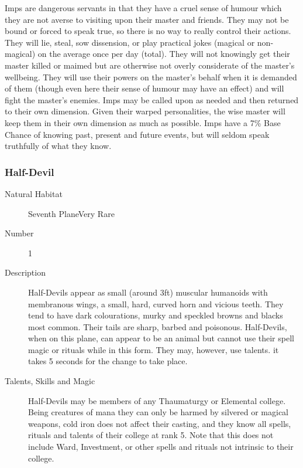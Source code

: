 \begin{multicols*}{2}
\begin{description}
\setlength\itemsep{0pt}

\item[Comments]Imps are dangerous servants in that they have a cruel sense
of humour which they are not averse to visiting upon their master and
friends.  They may not be bound or forced to speak true, so there is
no way to really control their actions.  They will lie, steal, sow
dissension, or play practical jokes (magical or non-magical) on the
average once per day (total).  They will not knowingly get their
master killed or maimed but are otherwise not overly considerate of
the master's wellbeing.  They will use their powers on the master's
behalf when it is demanded of them (though even here their sense of
humour may have an effect) and will fight the master's enemies.  Imps
may be called upon as needed and then returned to their own dimension.
Given their warped personalities, the wise master will keep them in
their own dimension as much as possible.  Imps have a 7\% Base
Chance of knowing past, present and future events, but will seldom
speak truthfully of what they know.

\end{description}

\subsubsection{Half-Devil}

\begin{description}
\item[Natural Habitat]Seventh PlaneVery Rare

\item[Number] 1

\item[Description]Half-Devils appear as small (around 3ft) muscular humanoids with
membranous wings, a small, hard, curved horn and vicious teeth.  They
tend to have dark colourations, murky and speckled browns and blacks
most common.  Their tails are sharp, barbed and poisonous.
Half-Devils, when on this plane, can appear to be an animal but cannot
use their spell magic or rituals while in this form.  They may,
however, use talents.  it takes 5 seconds for the change to take
place.

\item[Talents, Skills and Magic]Half-Devils may be members of any Thaumaturgy or Elemental
college.  Being creatures of mana they can only be harmed by silvered
or magical weapons, cold iron does not affect their casting, and they
know all spells, rituals and talents of their college at rank 5.  Note
that this does not include Ward, Investment, or other spells and
rituals not intrinsic to their college.


\end{description}
\end{multicols*}
